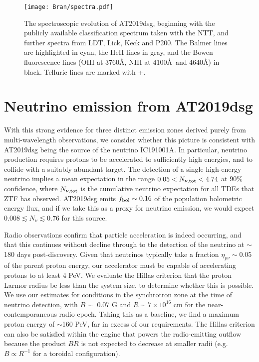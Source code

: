 \begin{figure*}[h!]
	\texttt{[image: Bran/spectra.pdf]}
	\caption{The spectroscopic evolution of AT2019dsg, beginning with the publicly available classification spectrum taken with the NTT\cite{2019ATel12752....1N}, and further spectra from LDT, Lick, Keck and P200. The Balmer lines are highlighted in cyan, the HeII lines in gray, and the Bowen fluorescence lines (OIII at 3760\AA, NIII at 4100\AA ~and 4640\AA) in black. Telluric lines are marked with +.}
	\label{fig:bran_spectrum}
\end{figure*}

\section{Neutrino emission from AT2019dsg} With this strong evidence for three distinct emission zones derived purely from multi-wavelength observations, we consider whether this picture is consistent with AT2019dsg being the source of the neutrino IC191001A. In particular, neutrino production requires protons to be accelerated to sufficiently high energies, and to collide with a suitably abundant target. The detection of a single high-energy neutrino implies a mean expectation in the range $0.05 < N_{\nu, \textup{tot}} < 4.74$ at 90\% confidence, where $N_{\nu, \textup{tot}}$ is the cumulative neutrino expectation for all TDEs that ZTF has observed. AT2019dsg emits $f_{\textup{bol}} \sim 0.16$ of the population bolometric energy flux, and if we take this as a proxy for neutrino emission, we would expect $0.008 \lesssim N_{\nu} \lesssim 0.76$ for this source.


Radio observations confirm that particle acceleration is indeed occurring, and that this continues without decline through to the detection of the neutrino at $\sim$180 days post-discovery. Given that neutrinos typically take a fraction $\eta_{p\nu} \sim 0.05$ of the parent proton energy, our accelerator must be capable of accelerating protons to at least 4 PeV. We evaluate the Hillas criterion  that the proton Larmor radius be less than the system size, to determine whether this is possible. We use  our estimates for conditions in the synchrotron zone at the time of neutrino detection, with $B \sim$ 0.07 G and $R \sim 7 \times 10^{16}$ cm for the near-contemporaneous radio epoch. Taking this as a baseline, we find a maximum proton energy of $\sim$160 PeV, far in excess of our requirements. The Hillas criterion can also be satisfied within the engine that powers the radio-emitting outflow because the product $BR$ is not expected to decrease at smaller radii (e.g. $B \propto R^{-1}$ for a toroidal configuration). 

